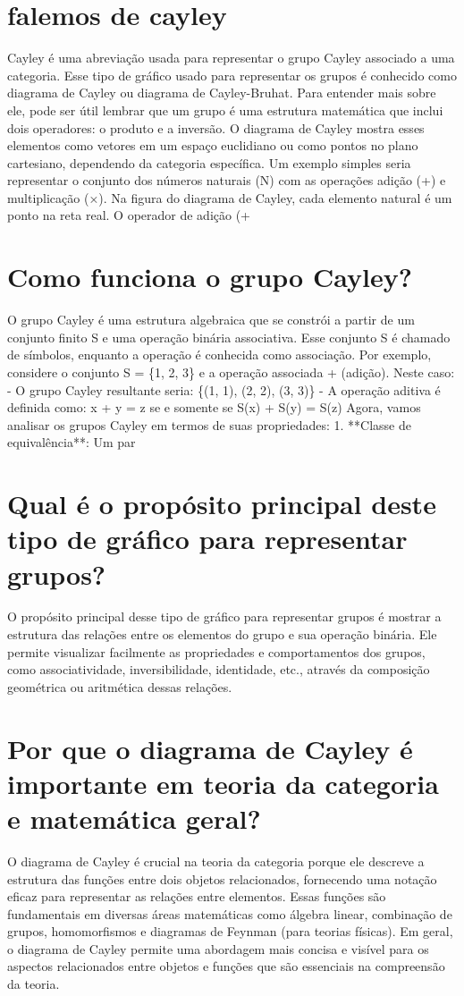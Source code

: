 \documentclass[11pt,a4paper]{article}
\begin{document}
\section{falemos de cayley}
Cayley é uma abreviação usada para representar o grupo Cayley associado a uma categoria. Esse tipo de gráfico usado para representar os grupos é conhecido como diagrama de Cayley ou diagrama de Cayley-Bruhat. Para entender mais sobre ele, pode ser útil lembrar que um grupo é uma estrutura matemática que inclui dois operadores: o produto e a inversão. O diagrama de Cayley mostra esses elementos como vetores em um espaço euclidiano ou como pontos no plano cartesiano, dependendo da categoria específica. Um exemplo simples seria representar o conjunto dos números naturais (N) com as operações adição (+) e multiplicação (×). Na figura do diagrama de Cayley, cada elemento natural é um ponto na reta real. O operador de adição (+

\section{Como funciona o grupo Cayley?}
O grupo Cayley é uma estrutura algebraica que se constrói a partir de um conjunto finito S e uma operação binária associativa. Esse conjunto S é chamado de símbolos, enquanto a operação é conhecida como associação. Por exemplo, considere o conjunto S = \{1, 2, 3\} e a operação associada + (adição). Neste caso: - O grupo Cayley resultante seria: \{(1, 1), (2, 2), (3, 3)\} - A operação aditiva é definida como: x + y = z se e somente se S(x) + S(y) = S(z) Agora, vamos analisar os grupos Cayley em termos de suas propriedades: 1. **Classe de equivalência**: Um par

\section{Qual é o propósito principal deste tipo de gráfico para representar grupos?}
O propósito principal desse tipo de gráfico para representar grupos é mostrar a estrutura das relações entre os elementos do grupo e sua operação binária. Ele permite visualizar facilmente as propriedades e comportamentos dos grupos, como associatividade, inversibilidade, identidade, etc., através da composição geométrica ou aritmética dessas relações.

\section{Por que o diagrama de Cayley é importante em teoria da categoria e matemática geral?}
O diagrama de Cayley é crucial na teoria da categoria porque ele descreve a estrutura das funções entre dois objetos relacionados, fornecendo uma notação eficaz para representar as relações entre elementos. Essas funções são fundamentais em diversas áreas matemáticas como álgebra linear, combinação de grupos, homomorfismos e diagramas de Feynman (para teorias físicas). Em geral, o diagrama de Cayley permite uma abordagem mais concisa e visível para os aspectos relacionados entre objetos e funções que são essenciais na compreensão da teoria.
\end{document}
